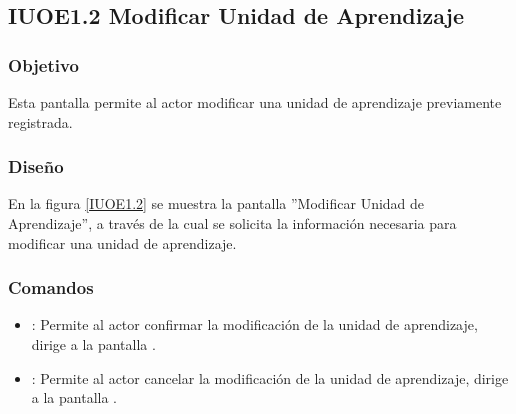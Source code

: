 \subsection{IUOE1.2 Modificar Unidad de Aprendizaje}

\subsubsection{Objetivo}
	Esta pantalla permite al actor modificar una unidad de aprendizaje previamente registrada.

\subsubsection{Diseño}
	En la figura \ref{IUOE1.2} se muestra la pantalla ''Modificar Unidad de Aprendizaje'', a través de la cual se solicita la información necesaria para modificar una unidad de aprendizaje.


\subsubsection{Comandos}
\begin{itemize}
	\item {}: Permite al actor confirmar la modificación de la unidad de aprendizaje, dirige a la pantalla .
	
	\item {}: Permite al actor cancelar la modificación de la unidad de aprendizaje, dirige a la pantalla .
\end{itemize}
